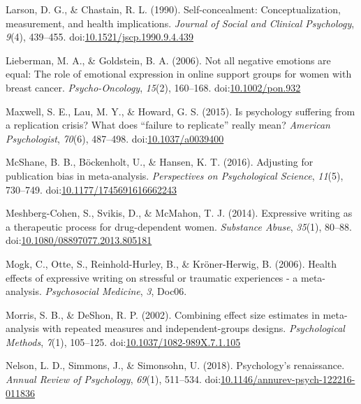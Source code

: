 \documentclass[english,man, mask]{apa6}
\theoremstyle{definition}
\theoremstyle{definition}
\theoremstyle{definition}
\theoremstyle{remark}
\begin{document}
\hypertarget{ref-Larson1990a}{}
Larson, D. G., \& Chastain, R. L. (1990). Self-concealment:
Conceptualization, measurement, and health implications. \emph{Journal
of Social and Clinical Psychology}, \emph{9}(4), 439--455.
doi:\href{https://doi.org/10.1521/jscp.1990.9.4.439}{10.1521/jscp.1990.9.4.439}

\hypertarget{ref-Lieberman2006}{}
Lieberman, M. A., \& Goldstein, B. A. (2006). Not all negative emotions
are equal: The role of emotional expression in online support groups for
women with breast cancer. \emph{Psycho-Oncology}, \emph{15}(2),
160--168. doi:\href{https://doi.org/10.1002/pon.932}{10.1002/pon.932}

\hypertarget{ref-Maxwell2015}{}
Maxwell, S. E., Lau, M. Y., \& Howard, G. S. (2015). Is psychology
suffering from a replication crisis? What does ``failure to replicate''
really mean? \emph{American Psychologist}, \emph{70}(6), 487--498.
doi:\href{https://doi.org/10.1037/a0039400}{10.1037/a0039400}

\hypertarget{ref-McShane2016}{}
McShane, B. B., Böckenholt, U., \& Hansen, K. T. (2016). Adjusting for
publication bias in meta-analysis. \emph{Perspectives on Psychological
Science}, \emph{11}(5), 730--749.
doi:\href{https://doi.org/10.1177/1745691616662243}{10.1177/1745691616662243}

\hypertarget{ref-Meshberg-Cohen2014}{}
Meshberg-Cohen, S., Svikis, D., \& McMahon, T. J. (2014). Expressive
writing as a therapeutic process for drug-dependent women.
\emph{Substance Abuse}, \emph{35}(1), 80--88.
doi:\href{https://doi.org/10.1080/08897077.2013.805181}{10.1080/08897077.2013.805181}

\hypertarget{ref-Mogk2006}{}
Mogk, C., Otte, S., Reinhold-Hurley, B., \& Kröner-Herwig, B. (2006).
Health effects of expressive writing on stressful or traumatic
experiences - a meta-analysis. \emph{Psychosocial Medicine}, \emph{3},
Doc06.

\hypertarget{ref-Morris2002}{}
Morris, S. B., \& DeShon, R. P. (2002). Combining effect size estimates
in meta-analysis with repeated measures and independent-groups designs.
\emph{Psychological Methods}, \emph{7}(1), 105--125.
doi:\href{https://doi.org/10.1037/1082-989X.7.1.105}{10.1037/1082-989X.7.1.105}

\hypertarget{ref-Nelson2018}{}
Nelson, L. D., Simmons, J., \& Simonsohn, U. (2018). Psychology's
renaissance. \emph{Annual Review of Psychology}, \emph{69}(1), 511--534.
doi:\href{https://doi.org/10.1146/annurev-psych-122216-011836}{10.1146/annurev-psych-122216-011836}
\end{document}
